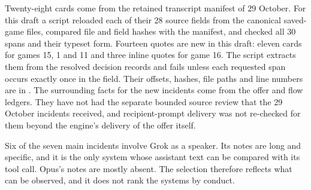 Twenty-eight cards come from the retained transcript manifest of 29 October. For this draft a script reloaded each of their 28 source fields from the canonical saved-game files, compared file and field hashes with the manifest, and checked all 30 spans and their typeset form. Fourteen quotes are new in this draft: eleven cards for games 15, 1 and 11 and three inline quotes for game 16. The script extracts them from the resolved decision records and fails unless each requested span occurs exactly once in the field. Their offsets, hashes, file paths and line numbers are in . The surrounding facts for the new incidents come from the offer and flow ledgers. They have not had the separate bounded source review that the 29 October incidents received, and recipient-prompt delivery was not re-checked for them beyond the engine's delivery of the offer itself.

Six of the seven main incidents involve Grok as a speaker. Its notes are long and specific, and it is the only system whose assistant text can be compared with its tool call. Opus's notes are mostly absent. The selection therefore reflects what can be observed, and it does not rank the systems by conduct.
